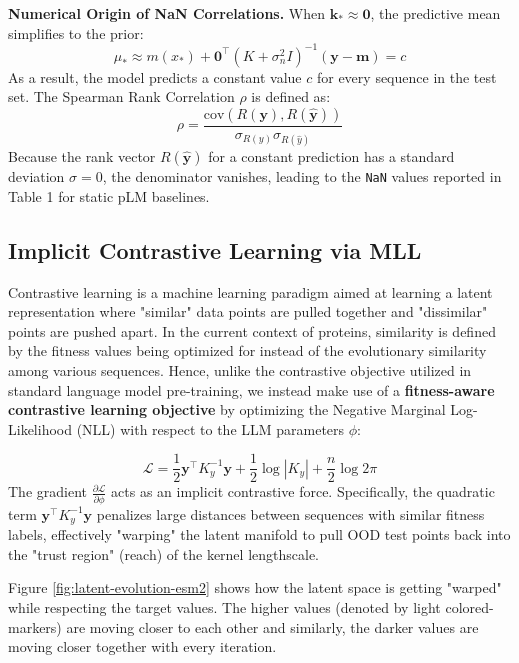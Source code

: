 \documentclass{article}
\theoremstyle{plain}
\theoremstyle{definition}
\theoremstyle{remark}
\begin{document}
\textbf{Numerical Origin of NaN Correlations.}
When $\mathbf{k}_* \approx \mathbf{0}$, the predictive mean simplifies to the prior:
\begin{equation}
    \mu_* \approx m(x_*) + \mathbf{0}^\top (K + \sigma_n^2 I)^{-1} (\mathbf{y} - \mathbf{m}) = c
\end{equation}
As a result, the model predicts a constant value $c$ for every sequence in the test set. The Spearman Rank Correlation $\rho$ is defined as:
\begin{equation}
    \rho = \frac{\text{cov}(R(\mathbf{y}), R(\hat{\mathbf{y}}))}{\sigma_{R(y)} \sigma_{R(\hat{y})}}
\end{equation}
Because the rank vector $R(\hat{\mathbf{y}})$ for a constant prediction has a standard deviation $\sigma = 0$, the denominator vanishes, leading to the \texttt{NaN} values reported in Table 1 for static pLM baselines.

\subsection{Implicit Contrastive Learning via MLL}
Contrastive learning is a machine learning paradigm aimed at learning a latent representation where "similar" data points are pulled together and "dissimilar" points are pushed apart. In the current context of proteins, similarity is defined by the fitness values being optimized for instead of the evolutionary similarity among various sequences. Hence, unlike the contrastive objective utilized in standard language model pre-training, we instead make use of a \textbf{fitness-aware contrastive learning objective} by optimizing the Negative Marginal Log-Likelihood (NLL) with respect to the LLM parameters $\phi$:

\begin{equation}
    \mathcal{L} = \frac{1}{2} \mathbf{y}^\top K_y^{-1} \mathbf{y} + \frac{1}{2} \log |K_y| + \frac{n}{2} \log 2\pi
\end{equation}
The gradient $\frac{\partial \mathcal{L}}{\partial \phi}$ acts as an implicit contrastive force. Specifically, the quadratic term $\mathbf{y}^\top K_y^{-1} \mathbf{y}$ penalizes large distances between sequences with similar fitness labels, effectively "warping" the latent manifold to pull OOD test points back into the "trust region" (reach) of the kernel lengthscale.

Figure \ref{fig:latent-evolution-esm2} shows how the latent space is getting "warped" while respecting the target values. The higher values (denoted by light colored-markers) are moving closer to each other and similarly, the darker values are moving closer together with every iteration. 
\end{document}
